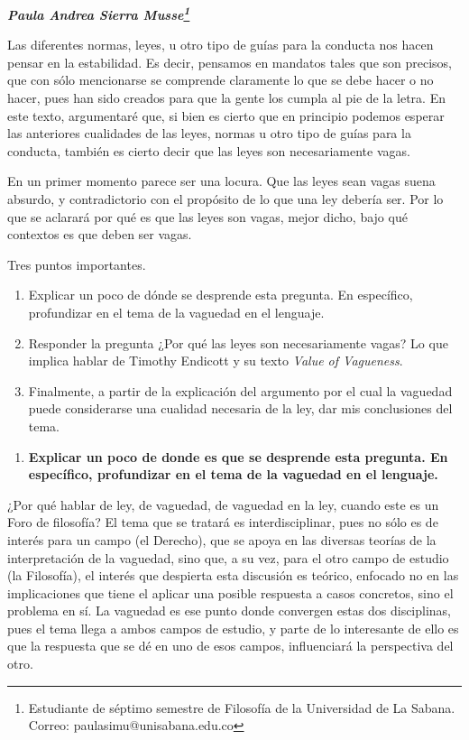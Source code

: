 \documentclass[]{book}
\newcommand{\autor}[1]{            %
  \begin{center}                   %
    \vspace*{-3.5em}               %
    \textbf{\textit{\large #1}}    %
    \vspace*{+4em}                 %
  \end{center}
}
\begin{document}
\autor{Paula Andrea Sierra Musse\footnote{Estudiante de séptimo
  semestre de Filosofía de la Universidad de La Sabana. Correo:
  paulasimu@unisabana.edu.co}}

Las diferentes normas, leyes, u otro tipo de guías para la conducta nos
hacen pensar en la estabilidad. Es decir, pensamos en mandatos tales que
son precisos, que con sólo mencionarse se comprende claramente lo que se
debe hacer o no hacer, pues han sido creados para que la gente los
cumpla al pie de la letra. En este texto, argumentaré que, si bien es
cierto que en principio podemos esperar las anteriores cualidades de las
leyes, normas u otro tipo de guías para la conducta, también es cierto
decir que las leyes son necesariamente vagas.

En un primer momento parece ser una locura. Que las leyes sean vagas
suena absurdo, y contradictorio con el propósito de lo que una ley
debería ser. Por lo que se aclarará por qué es que las leyes son vagas,
mejor dicho, bajo qué contextos es que deben ser vagas.

Tres puntos importantes.

\begin{enumerate}
\def\labelenumi{\arabic{enumi}.}
\item
  Explicar un poco de dónde se desprende esta pregunta. En específico,
  profundizar en el tema de la vaguedad en el lenguaje.
\item
  Responder la pregunta ¿Por qué las leyes son necesariamente vagas? Lo
  que implica hablar de Timothy Endicott y su texto \emph{Value of
  Vagueness}.
\item
  Finalmente, a partir de la explicación del argumento por el cual la
  vaguedad puede considerarse una cualidad necesaria de la ley, dar mis
  conclusiones del tema.
\end{enumerate}

\begin{enumerate}
\def\labelenumi{\arabic{enumi}.}
\item
  \textbf{Explicar un poco de donde es que se desprende esta pregunta.
  En específico, profundizar en el tema de la vaguedad en el lenguaje.}
\end{enumerate}

¿Por qué hablar de ley, de vaguedad, de vaguedad en la ley, cuando este
es un Foro de filosofía? El tema que se tratará es interdisciplinar,
pues no sólo es de interés para un campo (el Derecho), que se apoya en
las diversas teorías de la interpretación de la vaguedad, sino que, a su
vez, para el otro campo de estudio (la Filosofía), el interés que
despierta esta discusión es teórico, enfocado no en las implicaciones
que tiene el aplicar una posible respuesta a casos concretos, sino el
problema en sí. La vaguedad es ese punto donde convergen estas dos
disciplinas, pues el tema llega a ambos campos de estudio, y parte de lo
interesante de ello es que la respuesta que se dé en uno de esos campos,
influenciará la perspectiva del otro.
\end{document}
